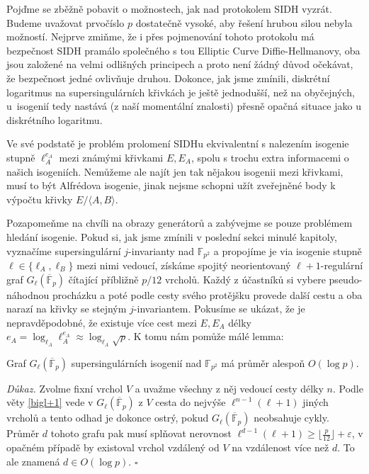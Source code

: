 \documentclass[12pt]{report}
\begin{document}
Pojďme se zběžně pobavit o možnostech, jak nad protokolem SIDH vyzrát. Budeme uvažovat prvočíslo $p$ dostatečně vysoké, aby řešení hrubou silou nebyla možností. Nejprve zmiňme, že i přes pojmenování tohoto protokolu má bezpečnost SIDH pramálo společného s tou Elliptic Curve Diffie-Hellmanovy, oba jsou založené na velmi odlišných principech a proto není žádný důvod očekávat, že bezpečnost jedné ovlivňuje druhou. Dokonce, jak jsme zmínili, diskrétní logaritmus na supersingulárních křivkách je ještě jednodušší, než na obyčejných, u~isogenií tedy nastává (z naší momentální znalosti) přesně opačná situace jako u diskrétního logaritmu.

Ve své podstatě je problém prolomení SIDHu ekvivalentní s nalezením isogenie stupně $\ell_A ^{e_A}$ mezi známými křivkami $E,E_A$, spolu s trochu extra informacemi o našich isogeniích. Nemůžeme ale najít jen tak nějakou isogenii mezi křivkami, musí to být Alfrédova isogenie, jinak nejsme schopni užít zveřejněné body k výpočtu křivky $E/\langle A,B \rangle$.

Pozapomeňme na chvíli na obrazy generátorů a zabývejme se pouze problémem hledání isogenie. Pokud si, jak jsme zmínili v poslední sekci minulé kapitoly, vyznačíme supersingulární $j$-invarianty nad $\mathbb{F}_{p^2}$ a propojíme je via isogenie stupně $\ell \in \lbrace \ell_A, \ell_B \rbrace$  mezi nimi vedoucí, získáme spojitý neorientovaný $\ell+1$-regulární graf $G_{\ell} (\overline{\mathbb{F}}_p)$ čítající příbližně $p/12$ vrcholů. Každý z účastníků si vybere pseudo-náhodnou procházku a poté podle cesty svého protějšku provede další cestu a oba narazí na křivky se stejným $j$-invariantem. Pokusíme se ukázat, že je nepravděpodobné, že existuje více cest mezi $E,E_A$ délky $e_A = \log_{\ell_A} \ell_A ^{e_A} \approx \log_{\ell_A} \sqrt{p}$. K tomu nám pomůže málé lemma:

\begin{lemma*}
Graf $G_{\ell} (\overline{\mathbb{F}}_p)$ supersingulárních isogenií nad $\mathbb{F}_{p^2}$ má průměr alespoň $O(\log p)$.
\end{lemma*}
\noindent \textit{Důkaz.} Zvolme fixní vrchol $V$ a uvažme všechny z něj vedoucí cesty délky $n$. Podle věty \ref{bigl+1} vede v $G_{\ell} (\overline{\mathbb{F}}_p)$ z $V$ cesta do nejvýše $\ell^{n-1} (\ell+1)$ jiných vrcholů a tento odhad je dokonce ostrý, pokud $G_{\ell} (\overline{\mathbb{F}}_p)$ neobsahuje cykly. Průměr $d$ tohoto grafu pak musí splňovat nerovnost $\ell^{d-1} (\ell+1) \geqslant \lfloor \frac{p}{12} \rfloor + \varepsilon$, v opačném případě by existoval vrchol vzdálený od $V$ na vzdálenost více než $d$. To ale znamená $d \in O(\log p)$. \hfill $\square$\\
\end{document}

